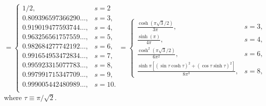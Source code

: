 \documentclass{amsart}
\begin{document}
\begin{equation}
=\left\{
\begin{array}{ll}
1/2,& s=2\\
0.809396597366290\ldots,& s=3,\\
0.919019477593744\ldots,& s=4,\\
0.963256561757559\ldots,& s=5,\\
0.982684277742192\ldots,& s=6,\\
0.991654953472834\ldots,& s=7,\\
0.995923315077783\ldots,& s=8,\\
0.997991715347709\ldots,& s=9,\\
0.999005442480989\ldots,& s=10.\\
\end{array}
\right.
=\left\{
\begin{array}{ll}
\frac{\cosh(\pi\surd 3/2)}{3\pi},& s=3,\\
\frac{\sinh(\pi)}{4\pi},& s=4,\\
\frac{\cosh^2(\pi\surd 3/2)}{6\pi^2},& s=6,\\
\frac{\sinh \pi\left[(\sin \tau\cosh\tau)^2+(\cos\tau\sinh \tau)^2\right]}{8\pi^3}
,& s=8,
\end{array}
\right.
\label{eq.Zofs}
\end{equation}
where $\tau\equiv \pi/\surd 2$.
\end{document}
